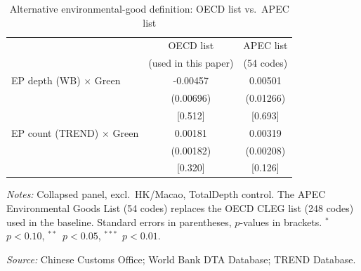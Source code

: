 \begin{table}[htbp]
\centering
\footnotesize
\caption{Alternative environmental-good definition: OECD list vs.\ APEC list}
\label{tab:apec}
\begin{threeparttable}
\begin{tabular}{lcc}
\toprule
 & OECD list & APEC list \\
 & (used in this paper) & (54 codes) \\
\midrule
EP depth (WB) $\times$ Green & -0.00457 & 0.00501 \\
 & (0.00696) & (0.01266) \\
 & [0.512] & [0.693] \\
\addlinespace
EP count (TREND) $\times$ Green & 0.00181 & 0.00319 \\
 & (0.00182) & (0.00208) \\
 & [0.320] & [0.126] \\
\bottomrule
\end{tabular}
\begin{tablenotes}[flushleft]\footnotesize
\item \emph{Notes:} Collapsed panel, excl.\ HK/Macao, TotalDepth control. The APEC Environmental Goods List (54 codes) replaces the OECD CLEG list (248 codes) used in the baseline. Standard errors in parentheses, $p$-values in brackets. $^{*}$~$p<0.10$, $^{**}$~$p<0.05$, $^{***}$~$p<0.01$.
\item \textit{Source:} Chinese Customs Office; World Bank DTA Database; TREND Database.
\end{tablenotes}
\end{threeparttable}
\end{table}
